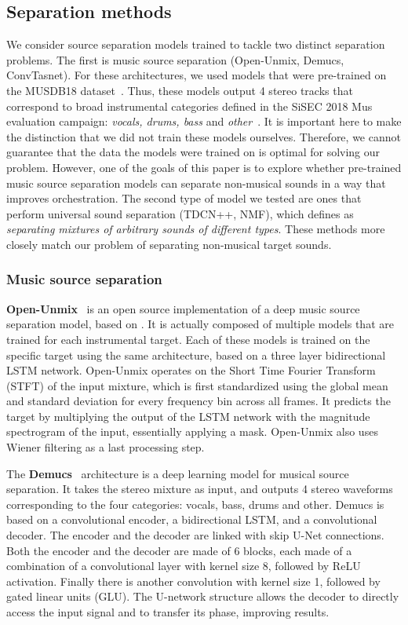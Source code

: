\documentclass{article}
\begin{document}
    \subsection{Separation methods}
  We consider source separation models trained to tackle two distinct separation problems. The first is music source separation (Open-Unmix, Demucs, ConvTasnet). For these architectures, we used models that were pre-trained on the MUSDB18 dataset~\cite{MUSDB18}. Thus, these models output 4 stereo tracks that correspond to broad instrumental categories defined in the SiSEC 2018 Mus evaluation campaign: \textit{vocals, drums, bass} and \textit{other}~\cite{Stoter_SiSEC}. It is important here to make the distinction that we did not train these models ourselves. Therefore, we cannot guarantee that the data the models were trained on is optimal for solving our problem. However, one of the goals of this paper is to explore whether pre-trained music source separation models can separate non-musical sounds in a way that improves orchestration.
  The second type of model we tested are ones that perform universal sound separation (TDCN++, NMF), which \cite{tdcnpp} defines as \textit{separating mixtures of arbitrary sounds of different types}. These methods more closely match our problem of separating non-musical target sounds.
      
      \subsubsection{Music source separation}
      \textbf{Open-Unmix}~\cite{open-unmix} is an open source implementation of a deep music source separation model, based on \cite{Uhlich2017}. It is actually composed of multiple models that are trained for each instrumental target. Each of these models is trained on the specific target using the same architecture, based on a three layer bidirectional LSTM network. Open-Unmix operates on the Short Time Fourier Transform (STFT) of the input mixture, which is first standardized using the global mean and standard deviation for every frequency bin across all frames. It predicts the target by multiplying the output of the LSTM network with the magnitude spectrogram of the input, essentially applying a mask. Open-Unmix also uses Wiener filtering as a last processing step.
      
      The \textbf{Demucs}~\cite{demucs} architecture is a deep learning model for musical source separation. It takes the stereo mixture as input, and outputs 4 stereo waveforms corresponding to the four categories: vocals, bass, drums and other. Demucs is based on a convolutional encoder, a bidirectional LSTM, and a convolutional decoder. The encoder and the decoder are linked with skip U-Net connections. Both the encoder and the decoder are made of 6 blocks, each made of a combination of a convolutional layer with kernel size 8, followed by ReLU activation. Finally there is another convolution with kernel size 1, followed by gated linear units (GLU). The U-network structure allows the decoder to directly access the input signal and to transfer its phase, improving results. 
\end{document}
